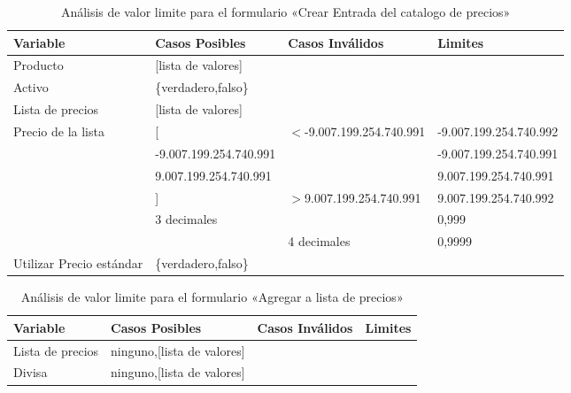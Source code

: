 \begin{table}[H]
\centering
\begin{tabular}{|p{3.0cm}|p{4.0cm}|p{4.0cm}|l|}
\hline
\footnotesize{\textbf{Variable}} & \footnotesize{\textbf{Casos Posibles}} & \footnotesize{\textbf{Casos Inválidos}} & \footnotesize{\textbf{Limites}} \\
\hline
\footnotesize{Producto} & \footnotesize{[lista de valores]} & & \\
\hline
\footnotesize{Activo}  & \footnotesize{\{verdadero,falso\}} & & \\
\hline
\footnotesize{Lista de precios} & \footnotesize{[lista de valores]} & & \\
\hline
\footnotesize{Precio de la lista} & \footnotesize{[} & \footnotesize{$<$-9.007.199.254.740.991} & \footnotesize{-9.007.199.254.740.992} \\
& \footnotesize{-9.007.199.254.740.991} & & \footnotesize{-9.007.199.254.740.991} \\
& \footnotesize{9.007.199.254.740.991} & & \footnotesize{9.007.199.254.740.991} \\
& \footnotesize{]} & \footnotesize{$>$9.007.199.254.740.991} & \footnotesize{9.007.199.254.740.992} \\
& \footnotesize{3 decimales} & & \footnotesize{0,999} \\
& & \footnotesize{4 decimales} & \footnotesize{0,9999} \\
\hline
\footnotesize{Utilizar Precio estándar} & \footnotesize{\{verdadero,falso\}} & & \\
\hline
\end{tabular}
\caption{Análisis de valor limite para el formulario «Crear Entrada del catalogo de precios»}
\label{myers_02}
\end{table}

\begin{table}[H]
\centering
\begin{tabular}{|p{6.0cm}|l|l|l|}
\hline
\footnotesize{\textbf{Variable}} & \footnotesize{\textbf{Casos Posibles}} & \footnotesize{\textbf{Casos Inválidos}} & \footnotesize{\textbf{Limites}} \\
\hline
\footnotesize{Lista de precios} & \footnotesize{ninguno,[lista de valores]} & & \\
\hline
\footnotesize{Divisa} & \footnotesize{ninguno,[lista de valores]} & & \\
\hline
\end{tabular}
\caption{Análisis de valor limite para el formulario «Agregar a lista de precios»}
\label{myers_03}
\end{table}

